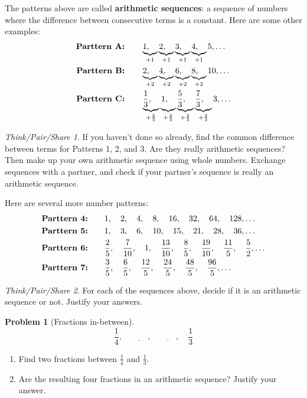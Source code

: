 \documentclass[10pt, reqno]{amsart}
\theoremstyle{remark}
\newtheorem*{thinkpair*}{Think/Pair/Share}
\theoremstyle{definition}
\newtheorem{problem}{Problem}
\numberwithin{equation}{section}  %
\begin{document}
The patterns above are called {\bf arithmetic sequences}: a sequence of numbers where the difference between consecutive terms is a constant.  Here are some other examples:
\begin{align*}
\text{\bf Parttern A:} &\qquad\underbrace{1, \quad }_{+1}\underbrace{2, \quad }_{+1}\underbrace{3, \quad }_{+1}\underbrace{4, \quad }_{+1}5, \ldots\\
\text{\bf Parttern B:} &\qquad\underbrace{2, \quad }_{+2}\underbrace{4, \quad }_{+2}\underbrace{6, \quad }_{+2}\underbrace{8, \quad }_{+2}10, \ldots\\
\text{\bf Parttern C:} &\qquad\underbrace{\frac 1 3, \quad}_{+\frac 2 3} \underbrace{ 1 , \phantom{\frac 12}}_{+\frac 2 3}\underbrace{ \frac 5 3, \quad}_{+\frac 2 3}\underbrace{\frac 7 3, \quad}_{+\frac 2 3}  3, \ldots
\end{align*}


\begin{thinkpair*}
If you haven't done so already, find the common difference between terms for Patterns 1, 2, and 3.  Are they really arithmetic sequences?  Then
make up your own arithmetic sequence using whole numbers.  Exchange sequences with a partner, and check if your partner's sequence is really an arithmetic sequence.
\end{thinkpair*}

Here are several more number patterns:
\begin{align*}
\text{\bf Parttern 4:} &\qquad 1, \quad  2 , \quad 4, \quad  8, \quad 16, \quad 32, \quad 64, \quad 128, \ldots\\
\text{\bf Parttern 5:} & \qquad 1, \quad  3 , \quad 6, \quad  10, \quad 15, \quad 21, \quad 28, \quad 36, \ldots\\
\text{\bf Parttern 6:} &\qquad \frac 2 5, \quad \frac 7{10} , \quad 1, \quad \frac {13}{10}, \quad \frac 8 5, \quad \frac {19}{10}, \quad \frac {11}5, \quad \frac 5 2, \ldots\\
\text{\bf Parttern 7:} &\qquad\frac 3 5, \quad \frac 6 5 , \quad \frac {12} 5, \quad \frac {24}{5}, \quad \frac {48} 5, \quad \frac {96}{5}, \ldots
\end{align*}


\begin{thinkpair*}
For each of the sequences above, decide if it is an arithmetic sequence or not.  Justify your answers.
\end{thinkpair*}



\begin{problem}[Fractions in-between]

\[
\frac 1 4, \quad \underline{\qquad}, \quad  \underline{\qquad}, \quad \frac 1 3
\]


\begin{enumerate}
\item
Find two fractions between $\frac 1 4$ and $\frac 1 3$.


\item
Are the resulting four fractions in an arithmetic sequence?  
Justify your answer.
\end{enumerate}


\end{problem}
\end{document}
